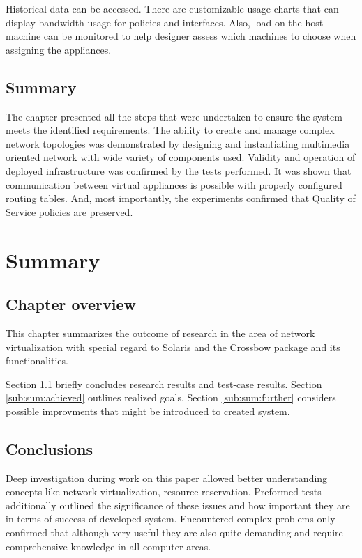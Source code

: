 \documentclass[11pt]{book}
\begin{document}
        Historical data can be accessed. There are customizable usage charts that can display bandwidth usage for
        policies and interfaces. Also, load on the host machine can be monitored to help designer assess which machines
        to choose when assigning the appliances.


    \section*{Summary}

      The chapter presented all the steps that were undertaken to ensure the system meets the identified requirements.
      The ability to create and manage complex network topologies was demonstrated by designing and instantiating
      multimedia oriented network with wide variety of components used. Validity and operation of deployed
      infrastructure was confirmed by the tests performed. It was shown that communication between virtual appliances is
      possible with properly configured routing tables. And, most importantly, the experiments confirmed that Quality of
      Service policies are preserved.


  \chapter{Summary}

    \section*{Chapter overview}

	  This chapter summarizes the outcome of research in the area of network virtualization with special regard to 
	  Solaris and the Crossbow package and its functionalities. 
	  
	  Section \ref{sub:sum:concl} briefly concludes research results and test-case results.
	  Section \ref{sub:sum:achieved} outlines realized goals.
	  Section \ref{sub:sum:further} considers possible improvments that might be introduced to created system.

    \section{Conclusions}
		\label{sub:sum:concl}
		
		Deep investigation during work on this paper allowed better understanding concepts like network virtualization,
		resource reservation. Preformed tests additionally outlined the significance of these issues and how important they
		are in terms of success of developed system. Encountered complex problems only confirmed that although very useful 
		they are also quite demanding and require comprehensive knowledge in all computer areas.
		
\end{document}
